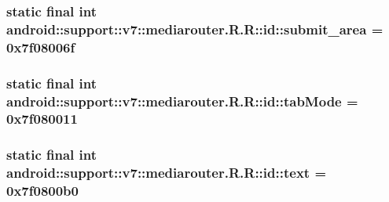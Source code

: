 \hypertarget{classandroid_1_1support_1_1v7_1_1mediarouter_1_1_r_1_1id_484c1a9b9cf20b79ced5d8610801db0d}{
\subsubsection[{submit\_\-area}]{\setlength{\rightskip}{0pt plus 5cm}static final int android::support::v7::mediarouter.R.R::id::submit\_\-area = 0x7f08006f}}
\label{classandroid_1_1support_1_1v7_1_1mediarouter_1_1_r_1_1id_484c1a9b9cf20b79ced5d8610801db0d}


\hypertarget{classandroid_1_1support_1_1v7_1_1mediarouter_1_1_r_1_1id_c2ce36fcc163126a83cf14a4e2dd7d0f}{
\subsubsection[{tabMode}]{\setlength{\rightskip}{0pt plus 5cm}static final int android::support::v7::mediarouter.R.R::id::tabMode = 0x7f080011}}
\label{classandroid_1_1support_1_1v7_1_1mediarouter_1_1_r_1_1id_c2ce36fcc163126a83cf14a4e2dd7d0f}


\hypertarget{classandroid_1_1support_1_1v7_1_1mediarouter_1_1_r_1_1id_e90221ec2b40a096aade1c4bad84986e}{
\subsubsection[{text}]{\setlength{\rightskip}{0pt plus 5cm}static final int android::support::v7::mediarouter.R.R::id::text = 0x7f0800b0}}
\label{classandroid_1_1support_1_1v7_1_1mediarouter_1_1_r_1_1id_e90221ec2b40a096aade1c4bad84986e}



